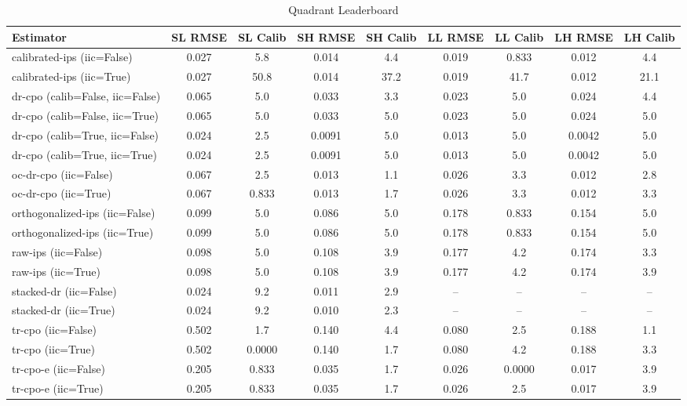 \begin{table}[htbp]
\centering
\caption{Quadrant Leaderboard}
\label{tab:A1}
\begin{tabular}{l|cccccccc}
\toprule
Estimator & SL RMSE & SL Calib & SH RMSE & SH Calib & LL RMSE & LL Calib & LH RMSE & LH Calib \\
\midrule
calibrated-ips (iic=False) & 0.027 & 5.8 & 0.014 & 4.4 & 0.019 & 0.833 & 0.012 & 4.4 \\
calibrated-ips (iic=True) & 0.027 & 50.8 & 0.014 & 37.2 & 0.019 & 41.7 & 0.012 & 21.1 \\
dr-cpo (calib=False, iic=False) & 0.065 & 5.0 & 0.033 & 3.3 & 0.023 & 5.0 & 0.024 & 4.4 \\
dr-cpo (calib=False, iic=True) & 0.065 & 5.0 & 0.033 & 5.0 & 0.023 & 5.0 & 0.024 & 5.0 \\
dr-cpo (calib=True, iic=False) & 0.024 & 2.5 & 0.0091 & 5.0 & 0.013 & 5.0 & 0.0042 & 5.0 \\
dr-cpo (calib=True, iic=True) & 0.024 & 2.5 & 0.0091 & 5.0 & 0.013 & 5.0 & 0.0042 & 5.0 \\
oc-dr-cpo (iic=False) & 0.067 & 2.5 & 0.013 & 1.1 & 0.026 & 3.3 & 0.012 & 2.8 \\
oc-dr-cpo (iic=True) & 0.067 & 0.833 & 0.013 & 1.7 & 0.026 & 3.3 & 0.012 & 3.3 \\
orthogonalized-ips (iic=False) & 0.099 & 5.0 & 0.086 & 5.0 & 0.178 & 0.833 & 0.154 & 5.0 \\
orthogonalized-ips (iic=True) & 0.099 & 5.0 & 0.086 & 5.0 & 0.178 & 0.833 & 0.154 & 5.0 \\
raw-ips (iic=False) & 0.098 & 5.0 & 0.108 & 3.9 & 0.177 & 4.2 & 0.174 & 3.3 \\
raw-ips (iic=True) & 0.098 & 5.0 & 0.108 & 3.9 & 0.177 & 4.2 & 0.174 & 3.9 \\
stacked-dr (iic=False) & 0.024 & 9.2 & 0.011 & 2.9 & -- & -- & -- & -- \\
stacked-dr (iic=True) & 0.024 & 9.2 & 0.010 & 2.3 & -- & -- & -- & -- \\
tr-cpo (iic=False) & 0.502 & 1.7 & 0.140 & 4.4 & 0.080 & 2.5 & 0.188 & 1.1 \\
tr-cpo (iic=True) & 0.502 & 0.0000 & 0.140 & 1.7 & 0.080 & 4.2 & 0.188 & 3.3 \\
tr-cpo-e (iic=False) & 0.205 & 0.833 & 0.035 & 1.7 & 0.026 & 0.0000 & 0.017 & 3.9 \\
tr-cpo-e (iic=True) & 0.205 & 0.833 & 0.035 & 1.7 & 0.026 & 2.5 & 0.017 & 3.9 \\
\bottomrule
\end{tabular}
\end{table}